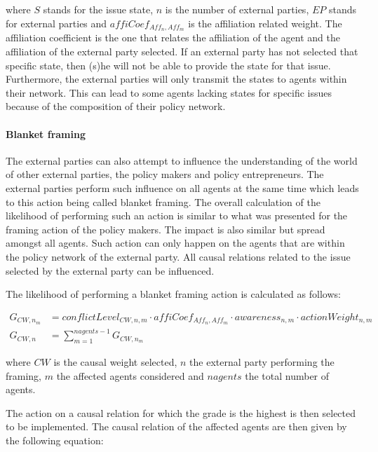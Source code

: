 where $S$ stands for the issue state, $n$ is the number of external parties, $EP$ stands for external parties and $affiCoef_{Aff_n,Aff_m}$ is the affiliation related weight. The affiliation coefficient is the one that relates the affiliation of the agent and the affiliation of the external party selected. If an external party has not selected that specific state, then (s)he will not be able to provide the state for that issue. Furthermore, the external parties will only transmit the states to agents within their network. This can lead to some agents lacking states for specific issues because of the composition of their policy network.

\paragraph{Blanket framing}

The external parties can also attempt to influence the understanding of the world of other external parties, the policy makers and policy entrepreneurs. The external parties perform such influence on all agents at the same time which leads to this action being called blanket framing. The overall calculation of the likelihood of performing such an action is similar to what was presented for the framing action of the policy makers. The impact is also similar but spread amongst all agents. Such action can only happen on the agents that are within the policy network of the external party. All causal relations related to the issue selected by the external party can be influenced.

The likelihood of performing a blanket framing action is calculated as follows:

\begin{equation}\begin{split}
G_{CW, n_m} &= conflictLevel_{CW, n, m} \cdot affiCoef_{Aff_n,Aff_m} \cdot awareness_{n,m} \cdot actionWeight_{n,m}\\
G_{CW, n} &= \sum_{m = 1}^{nagents-1} G_{CW, n_m}
\end{split}\end{equation}

where $CW$ is the causal weight selected, $n$ the external party performing the framing, $m$ the affected agents considered and $nagents$ the total number of agents.

The action on a causal relation for which the grade is the highest is then selected to be implemented. The causal relation of the affected agents are then given by the following equation:

